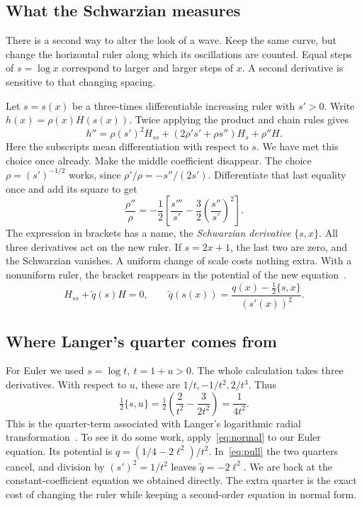 \documentclass[11pt,a4paper]{amsart}
\theoremstyle{definition}
\theoremstyle{remark}
\begin{document}
\subsection{What the Schwarzian measures}
There is a second way to alter the look of a wave. Keep the same curve, but change the horizontal ruler along which its oscillations are counted. Equal steps of \(s=\log x\) correspond to larger and larger steps of \(x\). A second derivative is sensitive to that changing spacing.

Let \(s=s(x)\) be a three-times differentiable increasing ruler with \(s'>0\). Write
\(h(x)=\rho(x)H(s(x))\). Twice applying the product and chain rules gives
\[
 h''=\rho(s')^2 H_{ss}+(2\rho's'+\rho s'')H_s+\rho''H.
\]
Here the subscripts mean differentiation with respect to \(s\). We have met this choice once already. Make the middle coefficient disappear. The choice \(\rho=(s')^{-1/2}\) works, since \(\rho'/\rho=-s''/(2s')\). Differentiate that last equality once and add its square to get
\[
 \frac{\rho''}{\rho}=-\frac12\left[\frac{s'''}{s'}-\frac32
             \left(\frac{s''}{s'}\right)^2\right].
\]
The expression in brackets has a name, the \emph{Schwarzian derivative} \(\{s,x\}\). All three derivatives act on the new ruler. If \(s=2x+1\), the last two are zero, and the Schwarzian vanishes. A uniform change of scale costs nothing extra. With a nonuniform ruler, the bracket reappears in the potential of the new equation~\cite{NISTChange}.
\begin{equation}\label{eq:pull}
 H_{ss}+\widetilde q(s)H=0,\qquad
 \widetilde q(s(x))=\frac{q(x)-\frac12\{s,x\}}{(s'(x))^2}.
\end{equation}

\subsection{Where Langer's quarter comes from}
For Euler we used \(s=\log t,\ t=1+u>0\). The whole calculation takes three derivatives. With respect to \(u\), these are \(1/t,-1/t^2,2/t^3\). Thus
\[
 \tfrac12\{s,u\}
  =\tfrac12\left(\frac{2}{t^2}-\frac{3}{2t^2}\right)
  =\frac{1}{4t^2}.
\]
This is the quarter-term associated with Langer's logarithmic radial transformation~\cite{Langer1937}. To see it do some work, apply~\eqref{eq:normal} to our Euler equation. Its potential is \(q=(1/4-2\ell^2)/t^2\). In~\eqref{eq:pull} the two quarters cancel, and division by \((s')^2=1/t^2\) leaves \(\widetilde q=-2\ell^2\). We are back at the constant-coefficient equation we obtained directly. The extra quarter is the exact cost of changing the ruler while keeping a second-order equation in normal form.
\end{document}
